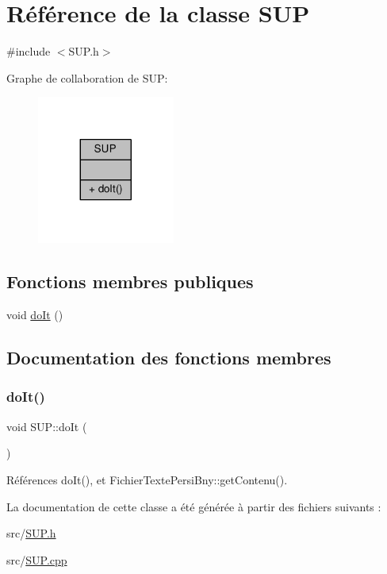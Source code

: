 \hypertarget{classSUP}{}\section{Référence de la classe S\+UP}
\label{classSUP}


{\ttfamily \#include $<$S\+U\+P.\+h$>$}



Graphe de collaboration de S\+UP\+:
\nopagebreak
\begin{figure}[H]
\begin{center}
\leavevmode
\includegraphics[width=128pt]{classSUP__coll__graph}
\end{center}
\end{figure}
\subsection*{Fonctions membres publiques}
\begin{DoxyCompactItemize}
\item 
void \hyperlink{classSUP_a00c939fd10402af9876dd3b6a0ff4abb}{do\+It} ()
\end{DoxyCompactItemize}


\subsection{Documentation des fonctions membres}
\mbox{\label{classSUP_a00c939fd10402af9876dd3b6a0ff4abb}} 
\subsubsection{\texorpdfstring{do\+It()}{doIt()}}
{\footnotesize\ttfamily void S\+U\+P\+::do\+It (\begin{DoxyParamCaption}{ }\end{DoxyParamCaption})}



Références do\+It(), et Fichier\+Texte\+Persi\+Bny\+::get\+Contenu().



La documentation de cette classe a été générée à partir des fichiers suivants \+:\begin{DoxyCompactItemize}
\item 
src/\hyperlink{SUP_8h}{S\+U\+P.\+h}\item 
src/\hyperlink{SUP_8cpp}{S\+U\+P.\+cpp}\end{DoxyCompactItemize}
